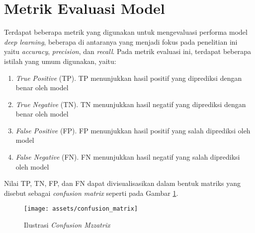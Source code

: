 \documentclass[a4paper,12pt]{report}
\begin{document}
\section{Metrik Evaluasi Model}
Terdapat beberapa metrik yang digunakan untuk mengevaluasi performa model \textit{deep learning}, beberapa di antaranya yang menjadi fokus pada penelitian ini yaitu \textit{accuracy}, \textit{precision}, dan \textit{recall}. Pada metrik evaluasi ini, terdapat beberapa istilah yang umum digunakan, yaitu: 
\begin{enumerate}
	\item \textit{True Positive} (TP). TP menunjukkan hasil positif yang diprediksi dengan benar oleh model
	\item \textit{True Negative} (TN). TN menunjukkan hasil negatif yang diprediksi dengan benar oleh model
	\item \textit{False Positive} (FP). FP menunjukkan hasil positif yang salah diprediksi oleh model
	\item \textit{False Negative} (FN). FN menunjukkan hasil negatif yang salah diprediksi oleh model
\end{enumerate}

Nilai TP, TN, FP, dan FN dapat divisualisasikan dalam bentuk matriks yang disebut sebagai \textit{confusion matrix} seperti pada Gambar \ref{conf_mat}.

\begin{figure}[H]
	\center \texttt{[image: assets/confusion\_matrix]}
	\caption{Ilustrasi \textit{Confusion Mzzatrix}} 
	\label{conf_mat}
\end{figure}
\end{document}
